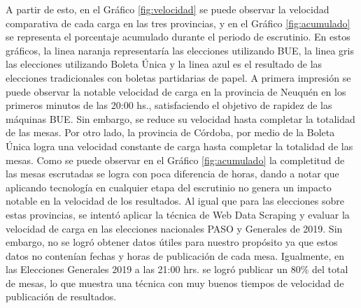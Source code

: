 A partir de esto, en el Gráfico \ref{fig:velocidad} se puede observar la velocidad comparativa de cada carga en las tres provincias, y en el Gráfico \ref{fig:acumulado} se representa el porcentaje acumulado durante el periodo de escrutinio. En estos gráficos, la linea naranja representaría las elecciones utilizando BUE, la linea gris las elecciones utilizando Boleta Única y la linea azul es el resultado de las elecciones tradicionales con boletas partidarias de papel. \newline
A primera impresión se puede observar la notable velocidad de carga en la provincia de Neuquén en los primeros minutos de las 20:00 hs., satisfaciendo el objetivo de rapidez de las máquinas BUE. Sin embargo, se reduce su velocidad hasta completar la totalidad de las mesas. Por otro lado, la provincia de Córdoba, por medio de la Boleta Única logra una velocidad constante de carga hasta completar la totalidad de las mesas. Como se puede observar en el Gráfico \ref{fig:acumulado} la completitud de las mesas escrutadas se logra con poca diferencia de horas, dando a notar que aplicando tecnología en cualquier etapa del escrutinio no genera un impacto notable en la velocidad de los resultados. 
Al igual que para las elecciones sobre estas provincias, se intentó aplicar la técnica de Web Data Scraping y evaluar la velocidad de carga en las elecciones nacionales PASO y Generales de 2019. Sin embargo, no se logró obtener datos útiles para nuestro propósito ya que estos datos no contenían fechas y horas de publicación de cada mesa. Igualmente, en las Elecciones Generales 2019 a las 21:00 hrs. se logró publicar un 80\% del total de mesas, lo que muestra una técnica con muy buenos tiempos de velocidad de publicación de resultados.
\newline


